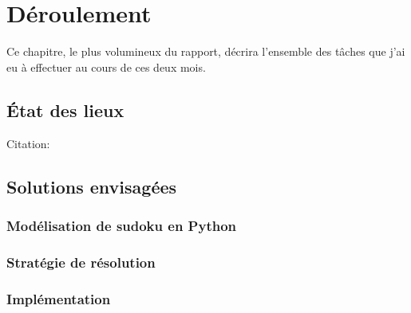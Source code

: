 \hypertarget{Déroulement}{%
\chapter{Déroulement}\label{Déroulement}}

Ce chapitre, le plus volumineux du rapport, décrira l'ensemble des tâches que j'ai eu à effectuer au cours de ces deux mois.


\section{État des lieux}
Citation:
\cite{Lympero}

\section{Solutions envisagées}
\subsection{Modélisation de sudoku en Python}
\subsection{Stratégie de résolution}
\subsection{Implémentation}
